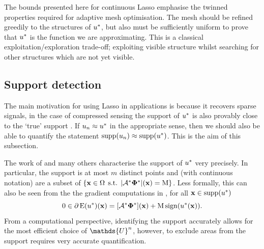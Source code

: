 \documentclass[10pt,a4paper,onecolumn]{article} \usepackage[latin1]{inputenc}
\numberwithin{equation}{section}
\let\F\mathds\let\C\mathcal\newcommand{\R}{\F{R}}\newcommand{\A}{\C{A}}
\newcommand{\op}[1]{\operatorname{#1}}\newcommand{\overtext}[2]{\stackrel{\text{#1}}{#2}}
\DeclareMathOperator{\st}{\;s.t.\;}\DeclareMathOperator{\as}{\;a.s.\;}\renewcommand{\epsilon}{\varepsilon}
\renewcommand{\vec}{\mathbf}
\newcommand{\UCmath}[1]{%
	\begingroup
	\ucmathlist\uppercase\expandafter{#1}%
	\endgroup
}
\newcommand{\ucmathlist}{%
	\def\alpha{\mathrm{A}}%
	\def\beta{\mathrm{B}}%
	\let\gamma=\Gamma
	\let\delta=\Delta
	\def\epsilon{\mathrm{E}}%
	\def\varepsilon{\mathrm{E}}%
	\def\zeta{\mathrm{Z}}%
	\def\eta{\mathrm{H}}%
	\let\theta=\Theta
	\let\vartheta=\Theta
	\def\iota{\mathrm{I}}%
	\def\kappa{\mathrm{K}}%
	\let\lambda=\Lambda
	\def\mu{\mathrm{M}}%
	\def\nu{\mathrm{N}}%
	\let\xi=\Xi
	\let\pi=\Pi
	\let\varpi=\Pi
	\def\rho{\mathrm{P}}%
	\def\varrho{\mathrm{P}}%
	\let\sigma=\Sigma
	\def\tau{\mathrm{T}}%
	\let\upsilon=\Upsilon
	\let\phi=\Phi
	\let\varphi=\Phi
	\def\chi{\mathrm{X}}%
	\let\psi=\Psi
	\let\omega=\Omega
}
\newcommand{\caps}[1]{\UCmath{#1}}
\newcommand*{\Func}[1]{%
	\IfEqCase{#1}{%
		{0}{\op{E}}%
		{1}{\op{F}}%
		{2}{\op{G}}%
		{3}{\op{H}}%
	}[\op{F}#1]%
}
\newcommand*{\varf}[1]{%
	\IfEqCase{#1}{%
		{0}{u}%
		{1}{v}%
		{2}{w}%
	}[u#1]%
}
\newcommand*{\spcf}[1]{%
	\IfEqCase{#1}{%
		{0}{\F{U}}%
		{1}{\F{V}}%
		{2}{\F{W}}%
	}[\F{U}#1]%
}
\newcommand*{\vard}[1]{%
	\IfEqCase{#1}{%
		{0}{\varphi}%
		{1}{\psi}%
	}[\varphi #1]%
}
\newcommand*{\varx}[1]{%
	\IfEqCase{#1}{%
		{0}{x}%
		{1}{y}%
		{2}{z}%
		{3}{r}%
	}[x#1]%
}
\newcommand*{\data}[1]{%
	\IfEqCase{#1}{%
		{0}{\eta}%
		{1}{\nu}%
	}[g]%
}
\newcommand{\Domain}{\Omega}
\newcommand*{\Varx}[1]{\caps{\varx{#1}}}
\newcommand*{\vvarx}[1]{\vec{\varx{#1}}}\newcommand*{\vVarx}[1]{\vec{\Varx{#1}}}
\newcommand*{\vvard}[1]{\vec{\vard{#1}}}\newcommand*{\vdata}[1]{\vec{\data{#1}}}
\begin{document}
The bounds presented here for continuous Lasso emphasise the twinned properties required for adaptive mesh optimisation. The mesh should be refined greedily to the structures of $\varf0^*$, but also must be sufficiently uniform to prove that $\varf0^*$ is the function we are approximating. This is a classical exploitation/exploration trade-off; exploiting visible structure whilst searching for other structures which are not yet visible.



\subsection{Support detection}\label{sec:ca: support detection}
The main motivation for using Lasso in applications is because it recovers sparse signals, in the case of compressed sensing the support of $\varf0^*$ is also provably close to the `true' support \cite{Duval2017a,Poon2018}. If $\varf0_n\approx \varf0^*$ in the appropriate sense, then we should also be able to quantify the statement $\op{supp}(\varf0_n)\approx\op{supp}(\varf0^*)$. This is the aim of this subsection.

The work of \cite{Duval2017a,Poon2018} and many others characterise the support of $\varf0^*$ very precisely. In particular, the support is at most $m$ distinct points and (with continuous notation) are a subset of $\{ \vvarx0\in\Domain \st |\A^*\vvard0^*|(\vvarx0) = \mu\} $. Less formally, this can also be seen from the the gradient computations in , for all $\vvarx0\in\supp(\varf0^*)$
$$0\in \partial \Func0(\varf0^*)(\vvarx0) = [\A^*\vvard0^*](\vvarx0) + \mu\sign(\varf0^*(\vvarx0)).$$
From a computational perspective, identifying the support accurately allows for the most efficient choice of $\spcf0^n$, however, to exclude areas from the support requires very accurate quantification.
\end{document}
